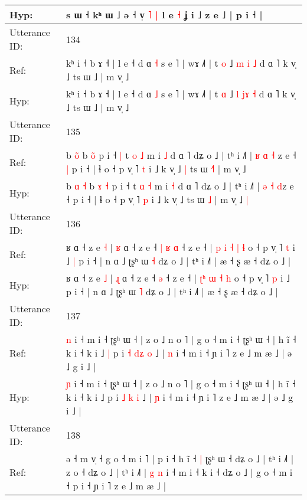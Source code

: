 \documentclass[10pt]{article}
\DeclareRobustCommand{\hl}[1]{{\textcolor{red}{#1}}}
\begin{document}
\begin{longtable}{ll}
 \\
Hyp: & s ɯ ˧ kʰ ɯ ˩ ə ˧ v̩\hl{}\hl{} \hl{}\hl{˥} \hl{|} l e \hl{˧} ʝ i ˩ z e ˩ | p i ˧ |
 \\
\midrule
Utterance ID: & 134 \\
Ref: & kʰ i ˧ b ɤ ˧ | l e ˧ d ɑ \hl{˧} s e ˥ | wɤ ˩˥ | t \hl{o} ˩ \hl{m} \hl{}\hl{i} \hl{˩} d ɑ ˥ k v̩ ˩ ts ɯ ˩ | m v̩ ˩
 \\
Hyp: & kʰ i ˧ b ɤ ˧ | l e ˧ d ɑ \hl{˩} s e ˥ | wɤ ˩˥ | t \hl{ɑ} ˩ \hl{l} \hl{j}\hl{ɤ} \hl{˧} d ɑ ˥ k v̩ ˩ ts ɯ ˩ | m v̩ ˩
 \\
\midrule
Utterance ID: & 135 \\
Ref: & b \hl{}\hl{o}\hl{̃} b \hl{}\hl{o}\hl{̃} p i ˧\hl{ }\hl{|} t \hl{o} \hl{˩} m i \hl{˩} d ɑ ˥ dʑ o ˩ | tʰ i ˩˥ | \hl{ʁ} \hl{ɑ} \hl{˧}\hl{ }z e ˧\hl{ }\hl{|} p i ˧ | ɬ o ˧ p v̩ ˥ \hl{t} i ˩ k v̩ ˩\hl{ }\hl{|} ts ɯ \hl{˧}\hl{˥} | m v̩ ˩\hl{}\hl{}
 \\
Hyp: & b \hl{ɑ}\hl{ }\hl{˧} b \hl{ɤ}\hl{ }\hl{˧} p i ˧\hl{}\hl{} t \hl{ɑ} \hl{˧} m i \hl{˧} d ɑ ˥ dʑ o ˩ | tʰ i ˩˥ | \hl{ə} \hl{˧} \hl{}\hl{d}z e ˧\hl{}\hl{} p i ˧ | ɬ o ˧ p v̩ ˥ \hl{p} i ˩ k v̩ ˩\hl{}\hl{} ts ɯ \hl{}\hl{˩} | m v̩ ˩\hl{ }\hl{|}
 \\
\midrule
Utterance ID: & 136 \\
Ref: & ʁ ɑ ˧ z e \hl{˧} | \hl{ʁ} ɑ ˧ z e ˧\hl{ }\hl{|}\hl{ }\hl{ʁ} \hl{ɑ} ˧ z e ˧ | \hl{p}\hl{ }\hl{i} \hl{˧} \hl{|} \hl{ɬ} o ˧ p v̩ ˥ \hl{t} i ˩\hl{ }\hl{|} p i ˧ | n ɑ ˩ ʈʂʰ ɯ \hl{˧} dʑ o ˩ | tʰ i ˩˥ | æ ˧ ʂ æ ˧ dʑ o ˩ |
 \\
Hyp: & ʁ ɑ ˧ z e \hl{˩} | \hl{ɻ} ɑ ˧ z e ˧\hl{}\hl{}\hl{}\hl{} \hl{ə} ˧ z e ˧ | \hl{}\hl{ʈ}\hl{ʰ} \hl{ɯ} \hl{˧} \hl{h} o ˧ p v̩ ˥ \hl{p} i ˩\hl{}\hl{} p i ˧ | n ɑ ˩ ʈʂʰ ɯ \hl{˥} dʑ o ˩ | tʰ i ˩˥ | æ ˧ ʂ æ ˧ dʑ o ˩ |
 \\
\midrule
Utterance ID: & 137 \\
Ref: & \hl{n} i ˧ m i ˧ ʈʂʰ ɯ ˧ | z o ˩ n o ˥ | g o ˧ m i ˧ ʈʂʰ ɯ ˧ | h ĩ ˧ k i ˧ k i ˩\hl{ }\hl{|} p i \hl{˧} \hl{d}\hl{ʑ} \hl{o} ˩ | \hl{n} i ˧ m i ˧ ɲ i ˥ z e ˩ m æ ˩ | ə ˩ g i ˩ |
 \\
Hyp: & \hl{ɲ} i ˧ m i ˧ ʈʂʰ ɯ ˧ | z o ˩ n o ˥ | g o ˧ m i ˧ ʈʂʰ ɯ ˧ | h ĩ ˧ k i ˧ k i ˩\hl{}\hl{} p i \hl{˩} \hl{}\hl{k} \hl{i} ˩ | \hl{ɲ} i ˧ m i ˧ ɲ i ˥ z e ˩ m æ ˩ | ə ˩ g i ˩ |
 \\
\midrule
Utterance ID: & 138 \\
Ref: & ə ˧ m v̩ ˧ g o ˧ m i ˥ | p i ˧ h ĩ ˧\hl{ }\hl{|} ʈʂʰ ɯ ˧ dʑ o ˩ | tʰ i ˩˥ | z o ˧ dʑ o ˩ | tʰ i ˩˥ |\hl{ }\hl{g} \hl{n} i ˧ m i ˧ k i ˧ dʑ o ˩ | g o ˧\hl{}\hl{} m i ˧ p i ˧ ɲ i ˥ z e ˩ m æ ˩ |

\end{longtable}
\end{document}
